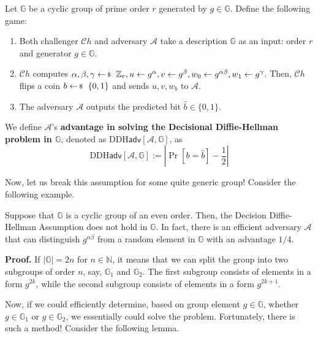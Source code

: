 \documentclass[../lecture-notes-148x210.tex]{subfiles}
\begin{document}
\begin{definition}
    Let $\mathbb{G}$ be a cyclic group of prime order $r$ generated by $g \in \mathbb{G}$. Define the following game:
    \begin{enumerate}
        \item Both challenger $\mathcal{C}h$ and adversary $\mathcal{A}$ take a description $\mathbb{G}$ as an input: order $r$ and generator $g \in \mathbb{G}$.
        \item $\mathcal{C}h$ computes $\alpha, \beta,\gamma \leftarrowS \mathbb{Z}_r, u \gets g^{\alpha}, v \gets g^{\beta}, w_0 \gets g^{\alpha\beta}, w_1 \gets g^{\gamma}$. Then, $\mathcal{C}h$ flips a coin $b \leftarrowS \{0,1\}$ and sends $u,v,w_b$ to $\mathcal{A}$.
        \item The adversary $\mathcal{A}$ outputs the predicted bit $\hat{b} \in \{0,1\}$.
    \end{enumerate}

    We define $\mathcal{A}$'s \textbf{advantage in solving the Decisional Diffie-Hellman problem in $\mathbb{G}$}, denoted as $\text{DDH}\mathsf{adv}[\mathcal{A},\mathbb{G}]$, as
    \begin{equation*}
        \text{DDH}\mathsf{adv}[\mathcal{A},\mathbb{G}] := \left| \Pr[b = \hat{b}] - \frac{1}{2} \right|
    \end{equation*}
\end{definition}

Now, let us break this assumption for some quite generic group! Consider the following example.

\begin{theorem}
    Suppose that $\mathbb{G}$ is a cyclic group of an even order. Then, the Decision
    Diffie-Hellman Assumption does not hold in $\mathbb{G}$. In fact, there is an efficient adversary $\mathcal{A}$ 
    that can distinguish $g^{\alpha\beta}$ from a random element in $\mathbb{G}$ with an advantage $1/4$.
\end{theorem}

\textbf{Proof.} If $|\mathbb{G}|=2n$ for $n \in \mathbb{N}$, it means that we can split the group into two subgroups 
of order $n$, say, $\mathbb{G}_1$ and $\mathbb{G}_2$. The first subgroup consists of elements in a form $g^{2k}$, 
while the second subgroup consists of elements in a form $g^{2k+1}$.

Now, if we could efficiently determine, based on group element $g \in \mathbb{G}$, whether $g \in \mathbb{G}_1$ or 
$g \in \mathbb{G}_2$, we essentially could solve the problem. Fortunately, there is such a method! Consider the 
following lemma.
\end{document}
